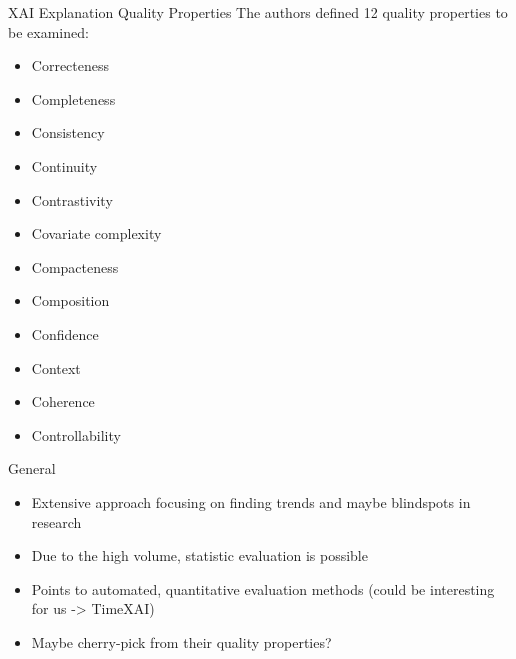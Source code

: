 \documentclass[presentation]{beamer}
\begin{document}
\begin{frame}
\begin{block}{XAI Explanation Quality Properties}
The authors defined 12 quality properties to be examined:
\begin{itemize}
\item Correcteness
\item Completeness
\item Consistency
\item Continuity
\item Contrastivity
\item Covariate complexity
\item Compacteness
\item Composition
\item Confidence
\item Context
\item Coherence
\item Controllability
\end{itemize}
\end{block}
\end{frame}
\begin{frame}
\begin{block}{General}
\begin{itemize}
\item Extensive approach focusing on finding trends and maybe blindspots in research
\item Due to the high volume, statistic evaluation is possible
\item Points to automated, quantitative evaluation methods (could be interesting for us -> TimeXAI)
\item Maybe cherry-pick from their quality properties?
\end{itemize}
\end{block}
\end{frame}
\end{document}
